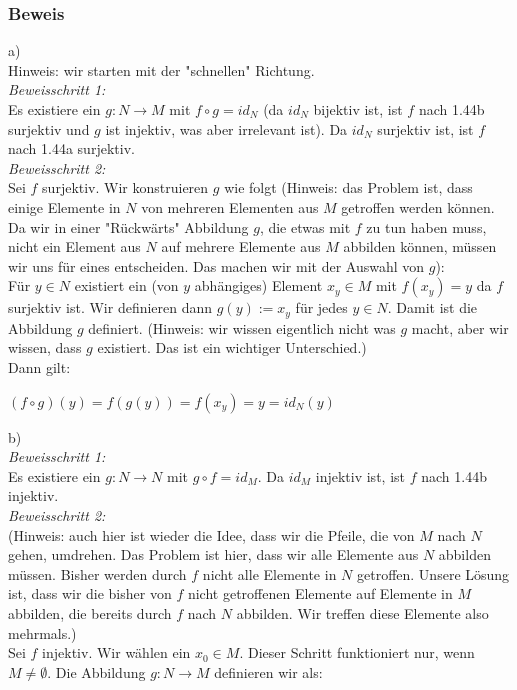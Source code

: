 \documentclass{article}
\begin{document}
\subsubsection*{Beweis}
a) \\
Hinweis: wir starten mit der "schnellen" Richtung. \\
\textit{Beweisschritt 1:} \\
Es existiere ein $g: N \rightarrow M$ mit $f \circ g = id_N$ (da $id_N$ bijektiv ist, ist $f$ nach 1.44b surjektiv und $g$ ist injektiv, was aber irrelevant ist). Da $id_N$ surjektiv ist, ist $f$ nach 1.44a surjektiv. \\
\textit{Beweisschritt 2:} \\
Sei $f$ surjektiv. Wir konstruieren $g$ wie folgt (Hinweis: das Problem ist, dass einige Elemente in $N$ von mehreren Elementen aus $M$ getroffen werden können. Da wir in einer "Rückwärts" Abbildung $g$, die etwas mit $f$ zu tun haben muss, nicht ein Element aus $N$ auf mehrere Elemente aus $M$ abbilden können, müssen wir uns für eines entscheiden. Das machen wir mit der Auswahl von $g$): \\
Für $y \in N$ existiert ein (von $y$ abhängiges) Element $x_y \in M$ mit $f(x_y) = y$ da $f$ surjektiv ist. Wir definieren dann $g(y) := x_y$ für jedes $y \in N$. Damit ist die Abbildung $g$ definiert. (Hinweis: wir wissen eigentlich nicht was $g$ macht, aber wir wissen, dass $g$ existiert. Das ist ein wichtiger Unterschied.) \\
Dann gilt:  
\begin{center}
    $(f \circ g)(y) = f(g(y)) = f(x_y) = y = id_N (y)$
\end{center}
b) \\
\textit{Beweisschritt 1:} \\
Es existiere ein $g: N \rightarrow N$ mit $g \circ f = id_M$. Da $id_M$ injektiv ist, ist $f$ nach 1.44b injektiv. \\
\textit{Beweisschritt 2:} \\
(Hinweis: auch hier ist wieder die Idee, dass wir die Pfeile, die von $M$ nach $N$ gehen, umdrehen. Das Problem ist hier, dass wir alle Elemente aus $N$ abbilden müssen. Bisher werden durch $f$ nicht alle Elemente in $N$ getroffen. Unsere Lösung ist, dass wir die bisher von $f$ nicht getroffenen Elemente auf Elemente in $M$ abbilden, die bereits durch $f$ nach $N$ abbilden. Wir treffen diese Elemente also mehrmals.) \\
Sei $f$ injektiv. Wir wählen ein $x_0 \in M$. Dieser Schritt funktioniert nur, wenn $M \neq \emptyset$. Die Abbildung $g: N \rightarrow M$ definieren wir als: \\
\end{document}

